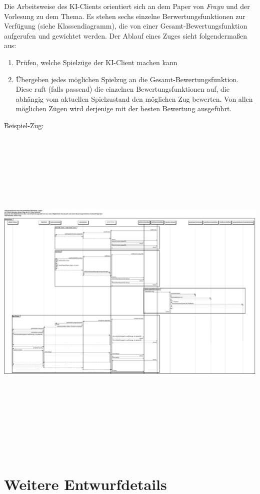 \documentclass[a4paper,10pt]{article}
\begin{document}
Die Arbeitsweise des KI-Clients orientiert sich an dem Paper von \textit{Frayn} und der Vorlesung zu dem Thema. Es stehen sechs einzelne Berwertungsfunktionen zur Verfügung (siehe Klassendiagramm), die von einer Gesamt-Bewertungsfunktion aufgerufen und gewichtet werden. Der Ablauf eines Zuges sieht folgendermaßen aus:
\begin{enumerate}
\item Prüfen, welche Spielzüge der KI-Client machen kann
\item Übergeben jedes möglichen Spielzug an die Gesamt-Bewertungsfunktion. Diese ruft (falls passend) die einzelnen Bewertungsfunktionen auf, die abhängig vom aktuellen Spielzustand den möglichen Zug bewerten. Von allen möglichen Zügen wird derjenige mit der besten Bewertung ausgeführt.
\end{enumerate}
Beispiel-Zug:\\
\includegraphics[angle = 90,height=17cm]{Sequenzdiagramme/ki_spielzug}
\section{Weitere Entwurfdetails}
\end{document}
